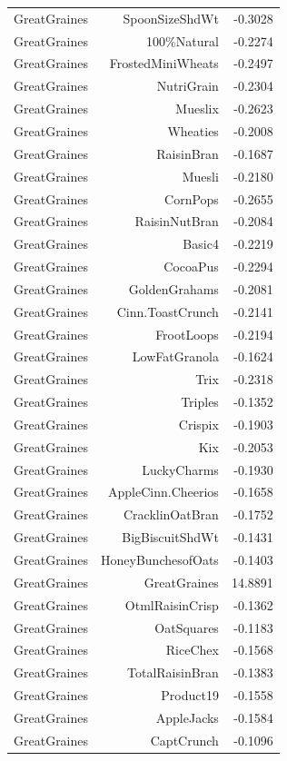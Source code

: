 \begin{longtable}{@{}lrr@{}}
GreatGraines & SpoonSizeShdWt & -0.3028 \\
GreatGraines & 100\%Natural & -0.2274 \\
GreatGraines & FrostedMiniWheats & -0.2497 \\
GreatGraines & NutriGrain & -0.2304 \\
GreatGraines & Mueslix & -0.2623 \\
GreatGraines & Wheaties & -0.2008 \\
GreatGraines & RaisinBran & -0.1687 \\
GreatGraines & Muesli & -0.2180 \\
GreatGraines & CornPops & -0.2655 \\
GreatGraines & RaisinNutBran & -0.2084 \\
GreatGraines & Basic4 & -0.2219 \\
GreatGraines & CocoaPus & -0.2294 \\
GreatGraines & GoldenGrahams & -0.2081 \\
GreatGraines & Cinn.ToastCrunch & -0.2141 \\
GreatGraines & FrootLoops & -0.2194 \\
GreatGraines & LowFatGranola & -0.1624 \\
GreatGraines & Trix & -0.2318 \\
GreatGraines & Triples & -0.1352 \\
GreatGraines & Crispix & -0.1903 \\
GreatGraines & Kix & -0.2053 \\
GreatGraines & LuckyCharms & -0.1930 \\
GreatGraines & AppleCinn.Cheerios & -0.1658 \\
GreatGraines & CracklinOatBran & -0.1752 \\
GreatGraines & BigBiscuitShdWt & -0.1431 \\
GreatGraines & HoneyBunchesofOats & -0.1403 \\
GreatGraines & GreatGraines & 14.8891 \\
GreatGraines & OtmlRaisinCrisp & -0.1362 \\
GreatGraines & OatSquares & -0.1183 \\
GreatGraines & RiceChex & -0.1568 \\
GreatGraines & TotalRaisinBran & -0.1383 \\
GreatGraines & Product19 & -0.1558 \\
GreatGraines & AppleJacks & -0.1584 \\
GreatGraines & CaptCrunch & -0.1096 \\

\end{longtable}
